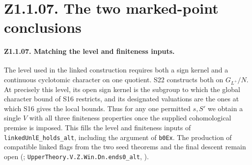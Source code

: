 \section*{Z1.1.07. The two marked-point conclusions}

\paragraph{Z1.1.07. Matching the level and finiteness inputs.}
\label{r8:small:Z1.1.07}
The level used in the linked construction requires both a sign kernel
and a continuous cyclotomic character on one quotient. S22 constructs
both on \(G_{L^+}/N\). At precisely this level, its open sign kernel is
the subgroup to which the global character bound of S16 restricts, and
its designated valuations are the ones at which S16 gives the local
bounds. Thus for any one permitted \(s,S'\) we obtain a single \(V\)
with all three finiteness properties once the supplied cohomological
premise is imposed. This fills the level and finiteness inputs of
\nolinkurl{linkedUnlE_holds_alt}, including the argument of
\nolinkurl{b0Ex}. The production of compatible linked flags from the two
seed theorems and the final descent remain open
(;
\nolinkurl{UpperTheory.V.Z.Win.Dn.ends0_alt},
).

